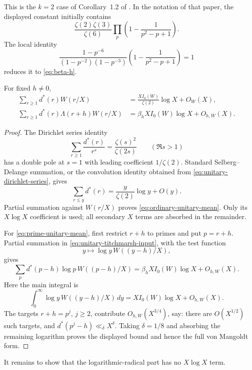 This is the $k=2$ case of Corollary~1.2 of
\citet{BiaoWang2026}.  In the notation of that paper, the displayed
constant initially contains
\[
 \frac{\zeta(2)\zeta(3)}{\zeta(6)}
 \prod_p\left(1-\frac1{p^2-p+1}\right).
\]
The local identity
\[
 \frac{1-p^{-6}}{(1-p^{-2})(1-p^{-3})}
 \left(1-\frac1{p^2-p+1}\right)=1
\]
reduces it to \eqref{eq:beta-h}.

\begin{lemma}
\label{lem:two-unitary-means}
For fixed $h\ne0$,
\begin{align}
 \sum_{r\geq1}d^*(r)W(r/X)
 &=\frac{XI_0(W)}{\zeta(2)}\log X+O_W(X),
 \label{eq:ordinary-unitary-mean}\\
 \sum_{r\geq1}d^*(r)\Lambda(r+h)W(r/X)
 &=\beta_hXI_0(W)\log X+O_{h,W}(X).
 \label{eq:prime-unitary-mean}
\end{align}
\end{lemma}

\begin{proof}
The Dirichlet series identity
\begin{equation}
 \sum_{r\geq1}\frac{d^*(r)}{r^s}
 =\frac{\zeta(s)^2}{\zeta(2s)}
 \qquad(\Re s>1)
 \label{eq:unitary-dirichlet-series}
\end{equation}
has a double pole at $s=1$ with leading coefficient $1/\zeta(2)$.
Standard Selberg--Delange summation, or the convolution identity obtained
from \eqref{eq:unitary-dirichlet-series}, gives
\[
 \sum_{r\leq y}d^*(r)
 =\frac y{\zeta(2)}\log y+O(y).
\]
Partial summation against $W(r/X)$ proves
\eqref{eq:ordinary-unitary-mean}.  Only its $X\log X$ coefficient is used;
all secondary $X$ terms are absorbed in the remainder.

For \eqref{eq:prime-unitary-mean}, first restrict $r+h$ to primes and put
$p=r+h$.  Partial summation in \eqref{eq:unitary-titchmarsh-input}, with
the test function
\[
 y\longmapsto \log y\,W((y-h)/X),
\]
gives
\[
 \sum_p d^*(p-h)\log p\,W((p-h)/X)
 =\beta_hXI_0(W)\log X+O_{h,W}(X).
\]
Here the main integral is
\[
 \int_0^\infty \log y\,W((y-h)/X)\,dy
 =XI_0(W)\log X+O_{h,W}(X).
\]
The targets $r+h=p^j$, $j\geq2$, contribute $O_{h,W}(X^{3/4})$, say:
there are $O(X^{1/2})$ such targets, and
$d^*(p^j-h)\ll_\delta X^\delta$.  Taking $\delta=1/8$ and absorbing the
remaining logarithm proves the displayed bound and hence the full von
Mangoldt form.
\end{proof}

It remains to show that the logarithmic-radical part has no $X\log X$
term.

